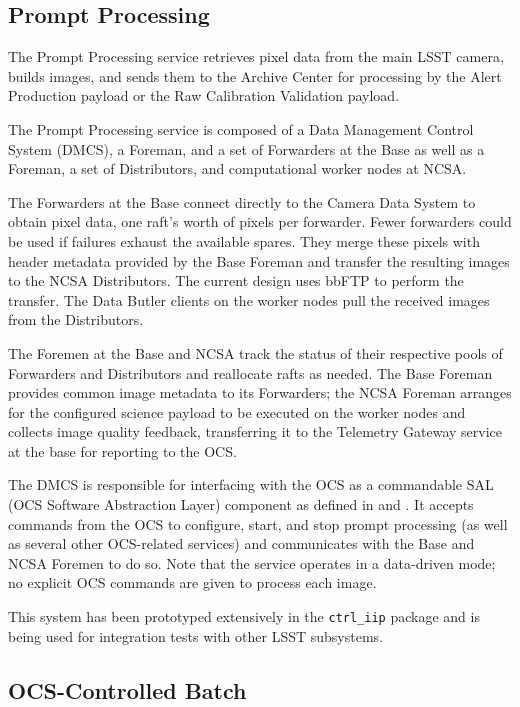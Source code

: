 \documentclass[DM,lsstdraft,toc]{lsstdoc}
\begin{document}
\subsection{Prompt Processing}\label{prompt-processing}

The Prompt Processing service retrieves pixel data from the main LSST camera,
builds images, and sends them to the Archive Center for processing by the Alert Production payload or the Raw Calibration Validation payload.

The Prompt Processing service is composed of a Data Management Control System
(DMCS), a Foreman, and a set of Forwarders at the Base as well as a Foreman, a
set of Distributors, and computational worker nodes at NCSA.

The Forwarders at the Base connect directly to the Camera Data System to obtain
pixel data, one raft's worth of pixels per forwarder.  Fewer forwarders could
be used if failures exhaust the available spares.  They merge these pixels with
header metadata provided by the Base Foreman and transfer the resulting images
to the NCSA Distributors.  The current design uses bbFTP to perform the
transfer.  The Data Butler clients on the worker nodes pull the received images
from the Distributors.

The Foremen at the Base and NCSA track the status of their respective pools of
Forwarders and Distributors and reallocate rafts as needed.  The Base Foreman
provides common image metadata to its Forwarders; the NCSA Foreman arranges for
the configured science payload to be executed on the worker nodes and collects
image quality feedback, transferring it to the Telemetry Gateway service at the
base for reporting to the OCS.

The DMCS is responsible for interfacing with the OCS as a commandable SAL
(OCS Software Abstraction Layer)
component as defined in  and .  It accepts
commands from the OCS to configure, start, and stop prompt processing (as well
as several other OCS-related services) and communicates with the Base and NCSA
Foremen to do so.  Note that the service operates in a data-driven mode; no
explicit OCS commands are given to process each image.

This system has been prototyped extensively in the \texttt{ctrl\_iip} package
and is being used for integration tests with other LSST subsystems.

\subsection{OCS-Controlled Batch}\label{ocs-controlled-batch}
\end{document}
